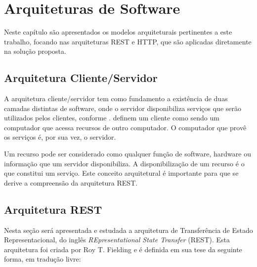 \chapter{Arquiteturas de Software}
\label{chap:arquitetura}

Neste capítulo são apresentados os modelos arquiteturais pertinentes a este trabalho, focando nas arquiteturas REST e HTTP, que são aplicadas diretamente na solução proposta.


\section{Arquitetura Cliente/Servidor}
\label{sec:arq:cli-serv}
A arquitetura cliente/servidor tem como fundamento a existência de duas camadas distintas de software, onde o servidor disponibiliza serviços que serão utilizados pelos clientes, conforme .  definem um cliente como sendo um computador que acessa recursos de outro computador. O computador que provê os serviços é, por sua vez, o servidor.


Um recurso pode ser considerado como qualquer função de software, hardware ou informação que um servidor disponibiliza. A disponibilização de um recurso é o que constitui um serviço. Este conceito arquitetural é importante para que se derive a compreensão da arquitetura REST.


\section{Arquitetura REST}

Nesta seção será apresentada e estudada a arquitetura de Transferência de Estado Representacional, do inglês \textit{REpresentational State Transfer} (REST). Esta arquitetura foi criada por Roy T. Fielding e é definida em sua tese \cite{FIELDING:2000} da seguinte forma, em tradução livre:

